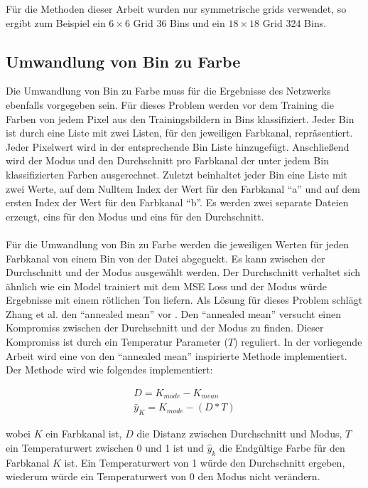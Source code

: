 Für die Methoden dieser Arbeit wurden nur symmetrische \gls{grid}s verwendet, so ergibt zum Beispiel ein $6 \times 6$ Grid 36 Bins und 
ein $18 \times 18$ Grid 324 Bins.

\subsection{Umwandlung von Bin zu Farbe}
Die Umwandlung von Bin zu Farbe muss für die Ergebnisse des Netzwerks ebenfalls vorgegeben sein. Für dieses Problem werden vor dem 
Training die Farben von jedem Pixel aus den Trainingsbildern in Bins klassifiziert. Jeder Bin ist durch eine Liste mit zwei Listen, 
für den jeweiligen Farbkanal, repräsentiert. Jeder Pixelwert wird in der entsprechende Bin Liste hinzugefügt. Anschließend wird der Modus 
und den Durchschnitt pro Farbkanal der unter jedem Bin klassifizierten Farben ausgerechnet. Zuletzt beinhaltet jeder Bin eine Liste mit zwei
Werte, auf dem Nulltem Index der Wert für den Farbkanal ``a'' und auf dem ersten Index der Wert für den Farbkanal ``b''. Es werden zwei separate
Dateien erzeugt, eins für den Modus und eins für den Durchschnitt.
\\
\\
Für die Umwandlung von Bin zu Farbe werden die jeweiligen Werten für jeden Farbkanal von einem Bin von der Datei abgeguckt. Es kann zwischen
der Durchschnitt und der Modus ausgewählt werden. Der Durchschnitt verhaltet sich ähnlich wie ein Model trainiert mit dem MSE Loss und der Modus
würde Ergebnisse mit einem rötlichen Ton liefern. Als Lösung für dieses Problem schlägt Zhang et al. den ``annealed mean'' vor \cite{zhang2016colorful}.
Den ``annealed mean'' versucht einen Kompromiss zwischen der Durchschnitt und der Modus zu finden. Dieser Kompromiss ist durch ein 
Temperatur Parameter ($T$) reguliert. In der vorliegende Arbeit wird eine von den ``annealed mean'' inspirierte Methode implementiert. 
Der Methode wird wie folgendes implementiert:

\begin{equation}
  \begin{gathered}
    D = K_{mode} - K_{mean} \\
    \hat{y}_{K} = K_{mode} - (D * T)
  \end{gathered}
\end{equation}

wobei $K$ ein Farbkanal ist, $D$ die Distanz zwischen Durchschnitt und Modus, $T$ ein Temperaturwert zwischen 0 und 1 ist und $\hat{y}_{k}$ die
Endgültige Farbe für den Farbkanal $K$ ist.
Ein Temperaturwert von 1 würde den Durchschnitt ergeben, wiederum würde ein Temperaturwert von 0 den Modus nicht verändern.

